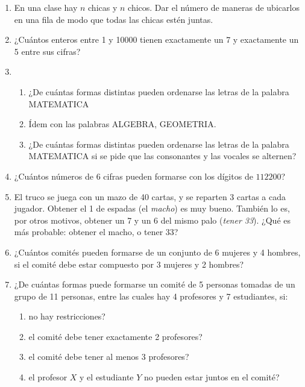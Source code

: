 \documentclass[a4paper,12pt,twoside,spanish,reqno]{amsbook}
\numberwithin{equation}{section}
\begin{document}
\begin {enumerate}
\item En una clase hay $n$ chicas y $n$ chicos. Dar el número de maneras de ubicarlos en una fila de modo que todas las chicas estén juntas.


\item ¿Cuántos enteros entre 1 y 10000 tienen exactamente un 7 y exactamente un 5 entre sus cifras?


\item 
\begin{enumerate}
	\item  ¿De cuántas formas distintas pueden ordenarse las letras de la palabra MATEMATICA
	\item \'Idem con las palabras ALGEBRA, GEOMETRIA.
	\item ¿De cuántas formas distintas pueden ordenarse las letras de la palabra MATEMATICA si se pide que las consonantes y las vocales se alternen?
\end{enumerate}


\item ¿Cuántos números de 6 cifras pueden formarse con los dígitos de $112200$?


\item El truco se juega con un mazo de 40 cartas, y se reparten 3 cartas a cada jugador. Obtener el 1 de espadas (el {\it macho}) es muy bueno. También lo es, por otros motivos, obtener un 7 y un 6 del mismo palo ({\it tener 33}). ¿Qué es más probable: obtener el macho, o tener 33?


\item ¿Cuántos comités pueden formarse de un conjunto de 6 mujeres y 4 hombres, si el comité debe estar compuesto por 3 mujeres y 2 hombres?


\item ¿De cuántas formas puede formarse un comité de 5 personas tomadas de un grupo de 11 personas, entre las cuales hay 4 profesores y 7 estudiantes, si:
\begin{enumerate}
    \item no hay restricciones?

    \item el comité debe tener exactamente 2 profesores?

    \item el comité debe tener al menos 3 profesores?

    \item el profesor $X$ y el estudiante $Y$ no pueden estar juntos en el comité?
\end{enumerate}



\end{enumerate}
\end{document}
